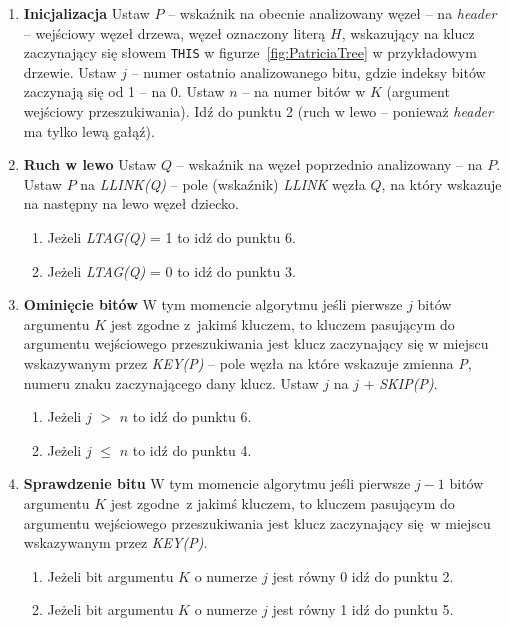 	\begin{enumerate}
		\item \textbf{Inicjalizacja} \newline
		Ustaw $P$ -- wskaźnik na obecnie analizowany węzeł -- na \emph{header} -- wejściowy węzeł drzewa, węzeł oznaczony literą $H$, wskazujący na klucz zaczynający się słowem \texttt{THIS} w figurze~\ref{fig:PatriciaTree} w przykładowym drzewie. \newline
		Ustaw $j$ -- numer ostatnio analizowanego bitu, gdzie indeksy bitów zaczynają się od 1 -- na 0. \newline
		Ustaw $n$ -- na numer bitów w $K$ (argument wejściowy przeszukiwania).
		Idź do punktu 2 (ruch w lewo -- ponieważ \emph{header} ma tylko lewą gałąź).
		
		\item \textbf{Ruch w lewo} \newline
		Ustaw $Q$ -- wskaźnik na węzeł poprzednio analizowany -- na $P$. \newline
		Ustaw $P$ na \emph{LLINK(Q)} -- pole (wskaźnik) \emph{LLINK} węzła $Q$, na który wskazuje na następny na lewo węzeł dziecko. 
		\begin{enumerate}
			\item Jeżeli \emph{LTAG(Q)} = 1 to idź do punktu 6.
			\item Jeżeli \emph{LTAG(Q)} = 0 to idź do punktu 3. 
		\end{enumerate}
		
		\item \textbf{Ominięcie bitów} \newline
		W tym momencie algorytmu jeśli pierwsze $j$ bitów argumentu $K$ jest zgodne z~jakimś kluczem, to kluczem pasującym do argumentu wejściowego przeszukiwania jest klucz zaczynający się w miejscu wskazywanym przez \emph{KEY(P)} -- pole węzła na które wskazuje zmienna \emph{P}, numeru znaku zaczynającego dany klucz. \newline
		Ustaw $j$ na $j$ + \emph{SKIP(P)}. 
		\begin{enumerate}
			\item Jeżeli $j$ $>$ $n$ to idź do punktu 6.
			\item Jeżeli $j$ $\leq$ $n$ to idź do punktu 4. 
		\end{enumerate}
		
		\item \textbf{Sprawdzenie bitu} \newline
		W tym momencie algorytmu jeśli pierwsze $j - 1$ bitów argumentu $K$ jest zgodne~z jakimś kluczem, to kluczem pasującym do argumentu wejściowego przeszukiwania jest klucz zaczynający się w miejscu wskazywanym przez \emph{KEY(P)}. 
		\begin{enumerate}
			\item Jeżeli bit argumentu $K$ o numerze $j$ jest równy 0 idź do punktu 2.
			\item Jeżeli bit argumentu $K$ o numerze $j$ jest równy 1 idź do punktu 5.
		\end{enumerate}
		

\end{enumerate}

